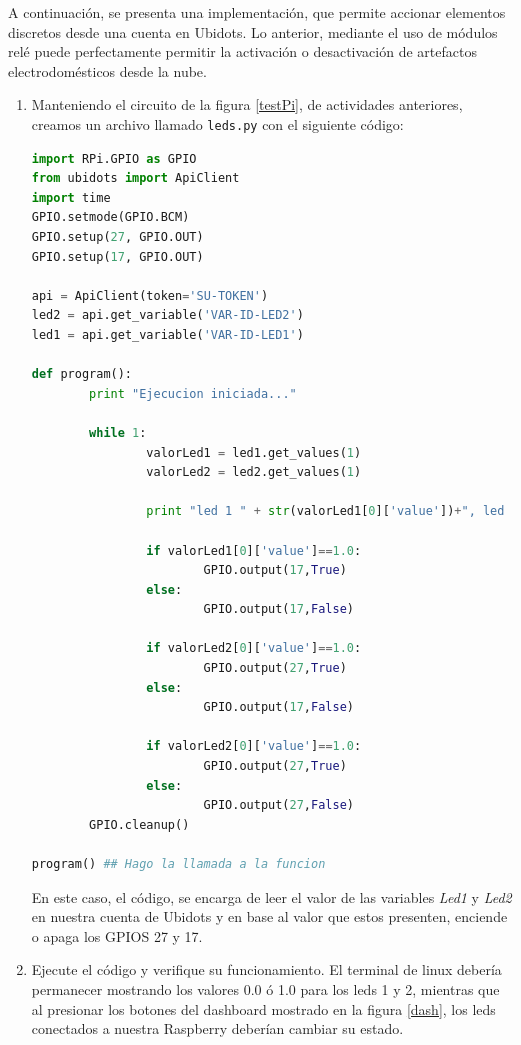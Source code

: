 \documentclass[letterpaper, 10pt]{report}
\begin{document}
A continuación, se presenta una implementación, que permite accionar elementos discretos desde una cuenta en Ubidots. Lo anterior, mediante el uso de módulos relé puede perfectamente permitir la activación o desactivación de artefactos electrodomésticos desde la nube.

\begin{enumerate}
\item Manteniendo el circuito de la figura \ref{testPi}, de actividades anteriores, creamos un archivo llamado \texttt{leds.py} con el siguiente código:

\begin{lstlisting}[language=Python, style=myArduino]
import RPi.GPIO as GPIO
from ubidots import ApiClient
import time
GPIO.setmode(GPIO.BCM)
GPIO.setup(27, GPIO.OUT)
GPIO.setup(17, GPIO.OUT)

api = ApiClient(token='SU-TOKEN')
led2 = api.get_variable('VAR-ID-LED2')
led1 = api.get_variable('VAR-ID-LED1')

def program():
        print "Ejecucion iniciada..."

        while 1:
                valorLed1 = led1.get_values(1)
                valorLed2 = led2.get_values(1)

                print "led 1 " + str(valorLed1[0]['value'])+", led 2 "+ str(valorLed2[0]['value'])

                if valorLed1[0]['value']==1.0:
                        GPIO.output(17,True)
                else:
                        GPIO.output(17,False)

                if valorLed2[0]['value']==1.0:
                        GPIO.output(27,True)
                else:
                        GPIO.output(17,False)

                if valorLed2[0]['value']==1.0:
                        GPIO.output(27,True)
                else:
                        GPIO.output(27,False)
        GPIO.cleanup()

program() ## Hago la llamada a la funcion
\end{lstlisting}

En este caso, el código, se encarga de leer el valor de las variables \emph{Led1} y \emph{Led2} en nuestra cuenta de Ubidots y en base al valor que estos presenten, enciende o apaga los GPIOS 27 y 17.

\item Ejecute el código y verifique su funcionamiento. El terminal de linux debería permanecer mostrando los valores 0.0 ó 1.0 para los leds 1 y 2, mientras que al presionar los botones del dashboard mostrado en la figura \ref{dash}, los leds conectados a nuestra Raspberry deberían cambiar su estado.


\end{enumerate}
\end{document}
